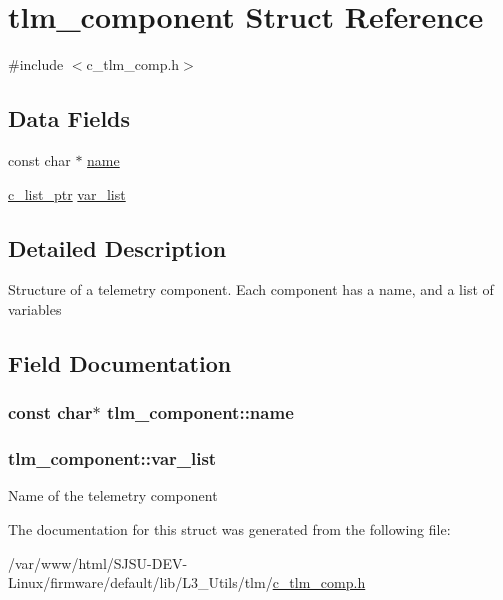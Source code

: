 \hypertarget{structtlm__component}{}\section{tlm\+\_\+component Struct Reference}
\label{structtlm__component}


{\ttfamily \#include $<$c\+\_\+tlm\+\_\+comp.\+h$>$}

\subsection*{Data Fields}
\begin{DoxyCompactItemize}
\item 
const char $\ast$ \hyperlink{structtlm__component_a4d1e870882eb6fe83697c8bba6cd474f}{name}
\item 
\hyperlink{c__list_8h_ac1348a934d8de3fb323ae00056260665}{c\+\_\+list\+\_\+ptr} \hyperlink{structtlm__component_ad005fa6d9ba2fec781a0514e376a222c}{var\+\_\+list}
\end{DoxyCompactItemize}


\subsection{Detailed Description}
Structure of a telemetry component. Each component has a name, and a list of variables 

\subsection{Field Documentation}
\subsubsection[{\texorpdfstring{name}{name}}]{\setlength{\rightskip}{0pt plus 5cm}const char$\ast$ tlm\+\_\+component\+::name}\hypertarget{structtlm__component_a4d1e870882eb6fe83697c8bba6cd474f}{}\label{structtlm__component_a4d1e870882eb6fe83697c8bba6cd474f}
\subsubsection[{\texorpdfstring{var\+\_\+list}{var_list}}]{ tlm\+\_\+component\+::var\+\_\+list}\hypertarget{structtlm__component_ad005fa6d9ba2fec781a0514e376a222c}{}\label{structtlm__component_ad005fa6d9ba2fec781a0514e376a222c}
Name of the telemetry component 

The documentation for this struct was generated from the following file\+:\begin{DoxyCompactItemize}
\item 
/var/www/html/\+S\+J\+S\+U-\/\+D\+E\+V-\/\+Linux/firmware/default/lib/\+L3\+\_\+\+Utils/tlm/\hyperlink{c__tlm__comp_8h}{c\+\_\+tlm\+\_\+comp.\+h}\end{DoxyCompactItemize}
